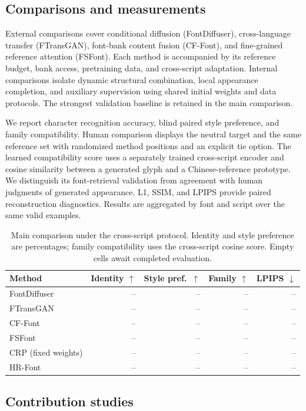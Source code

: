 \documentclass{article}
\newcommand{\method}{HR-Font\xspace}
\begin{document}
\subsection{Comparisons and measurements}
External comparisons cover conditional diffusion (FontDiffuser), cross-language transfer (FTransGAN), font-bank content fusion (CF-Font), and fine-grained reference attention (FSFont).
Each method is accompanied by its reference budget, bank access, pretraining data, and cross-script adaptation.
Internal comparisons isolate dynamic structural combination, local appearance completion, and auxiliary supervision using shared initial weights and data protocols.
The strongest validation baseline is retained in the main comparison.

We report character recognition accuracy, blind paired style preference, and family compatibility.
Human comparison displays the neutral target and the same reference set with randomized method positions and an explicit tie option.
The learned compatibility score uses a separately trained cross-script encoder and cosine similarity between a generated glyph and a Chinese-reference prototype.
We distinguish its font-retrieval validation from agreement with human judgments of generated appearance.
L1, SSIM, and LPIPS provide paired reconstruction diagnostics.
Results are aggregated by font and script over the same valid examples.

\begin{table}[t]
\centering\small
\caption{Main comparison under the cross-script protocol. Identity and style preference are percentages; family compatibility uses the cross-script cosine score. Empty cells await completed evaluation.}
\label{tab:main}
\begin{tabular}{lrrrr}
\toprule
Method & Identity $\uparrow$ & Style pref.\ $\uparrow$ & Family $\uparrow$ & LPIPS $\downarrow$\\
\midrule
FontDiffuser & -- & -- & -- & --\\
FTransGAN & -- & -- & -- & --\\
CF-Font & -- & -- & -- & --\\
FSFont & -- & -- & -- & --\\
CRP (fixed weights) & -- & -- & -- & --\\
\method & -- & -- & -- & --\\
\bottomrule
\end{tabular}
\end{table}

\subsection{Contribution studies}
\end{document}
